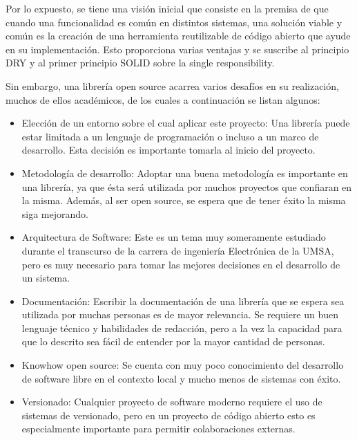 Por lo expuesto, se tiene una visión inicial que consiste en la premisa de que
cuando una funcionalidad es común en distintos sistemas, una solución viable y
común es la creación de una herramienta reutilizable de código abierto que ayude
en su implementación. Esto proporciona varias ventajas y se suscribe al
principio DRY  y al primer principio SOLID
sobre la single responsibility.

Sin embargo, una librería open source acarrea varios desafíos en su realización,
muchos de ellos académicos, de los cuales a continuación se listan algunos:

\begin{itemize}

    \item Elección de un entorno sobre el cual aplicar este proyecto: Una
          librería puede estar limitada a un lenguaje de programación o incluso a
          un marco de desarrollo. Esta decisión es importante tomarla al inicio
          del proyecto.

    \item Metodología de desarrollo: Adoptar una buena metodología es importante
          en una librería, ya que ésta será utilizada por muchos proyectos que
          confiaran en la misma. Además, al ser open source, se espera que de
          tener éxito la misma siga mejorando.

    \item Arquitectura de Software: Este es un tema muy someramente estudiado
          durante el transcurso de la carrera de ingeniería Electrónica de la
          UMSA, pero es muy necesario para tomar las mejores decisiones en el
          desarrollo de un sistema.

    \item Documentación: Escribir la documentación de una librería que se espera
          sea utilizada por muchas personas es de mayor relevancia. Se requiere un
          buen lenguaje técnico y habilidades de redacción, pero a la vez la
          capacidad para que lo descrito sea fácil de entender por la mayor
          cantidad de personas.

    \item Knowhow open source: Se cuenta con muy poco conocimiento del
          desarrollo de software libre en el contexto local y mucho menos de
          sistemas con éxito.

    \item Versionado: Cualquier proyecto de software moderno requiere el uso de
          sistemas de versionado, pero en un proyecto de código abierto esto es
          especialmente importante para permitir colaboraciones externas.


\end{itemize}

